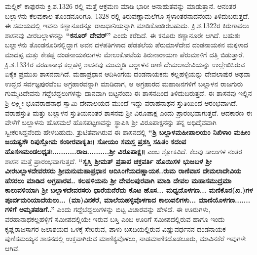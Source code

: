 ಮಲ್ಲಿಕ್​ ಕಾಫುರನು ಕ್ರಿ.ಶ.1326 ರಲ್ಲಿ ಮತ್ತೆ ಆಕ್ರಮಣ ಮಾಡಿ ಭಾರೀ ಅನಾಹುತವನ್ನು ಮಾಡುತ್ತಾನೆ. ಆನಂತರ ಬಲ್ಲಾಳನು ಕೆಲವುಕಾಲ ತೊಂಡನೂರಿಗೂ, 1328 ರಲ್ಲಿ ತಿರುವಣ್ಣಾಮಲೆಗೂ ಸ್ಥಳಾಂತರನಾದನೆಂದು ತಿಳಿದುಬರುತ್ತದೆ. ಈ ಸಮಯದಲ್ಲಿ ಇವನು ಕಣ್ಣಾನೂರನ್ನೂ ರಾಜಧಾನಿಯನ್ನಾಗಿ ಮಾಡಿಕೊಂಡಿರಬಹುದು. ಕ್ರಿ.ಶ.1322ರ ಕಿರುಗಾವಲು ಶಾಸನವು ವೀರಬಲ್ಲಾಳನನ್ನು \textbf{“ಕನೂರ್​ ದೇವರ್​”} ಎಂದು ಕರೆದಿದೆ. ಈ ಕನೂರು ಕಣ್ಣಾನೂರೇ ಆಗಿದೆ. ಬಹುಶಃ ಬಲ್ಲಾಳನು ತೊಂಡನೂರಿನಲ್ಲಿದ್ದಾಗ ಅವನ ದಳಪತಿಗಳಾದ ಹೆಡತಲೆಯ ಪೆರುಮಾಳೆದೇವ ದಂಡನಾಯಕನ ಮಕ್ಕಳಾದ ಮಾದಪ್ಪ ಮತ್ತು ಕೇತಪ್ಪ ದಂಡನಾಯಕರುಗಳು ಮೇಲುಕೋಟೆಯ ತಿರುನಾರಾಯಣ ಪೆರುಮಾಳಿಗೆ ದತ್ತಿ ಬಿಡುತ್ತಾರೆ. ಕ್ರಿ.ಶ.1334ರ ವರಹಾನಾಥ ಕಲ್ಲಹಳ್ಳಿ ಶಾಸನವು ಮುಮ್ಮಡಿ ಬಲ್ಲಾಳನ ರಾಣಿ ದೇಮಲಾದೇವಿಯನ್ನು ಉಲ್ಲೇಖಿಸಿರುವ ಏಕೈಕ ಪ್ರಮುಖ ಶಾಸನವಾಗಿದೆ. ಮಹಾಪ್ರಧಾನ ಆದಿಸಿಂಗೆಯ ದಂಡನಾಯಕನು ಕಲ್ಲಹಳ್ಳಿಯನ್ನು ದೇವಲಾಪುರ ಅಥವಾ ಉದ್ಭವ ಸರ್ವಜ್ಞಪುರವೆಂಬ ಅಗ್ರಹಾರವನ್ನಾಗಿ ಮಾಡಿದಾಗ, ಆ ಅಗ್ರಹಾರದ ಮಹಾಜನಗಳಿಗೆ ಬಲ್ಲಾಳನ ರಾಜಗುರು ಗುಮ್ಮಟದೇವನು ಗದ್ದೆಬೆದ್ದಲುಗಳನ್ನು ದಾನವಾಗಿ ಬಿಟ್ಟನೆಂದು ಈ ಶಾಸನದಿಂದ ತಿಳಿದುಬರುತ್ತದೆ. ಈ ಶಾಸನವು ಇಲ್ಲಿನ ಶ್ರಿ ಲಕ್ಷ್ಮೀ ಭೂವರಾಹನಾಥ ಸ್ವಾಮಿ ದೇವಾಲಯದ ಮುಂದೆ ಇದ್ದು ವರಾಹನಾಥನ ಸ್ತುತಿಯಿಂದ ಆರಂಭವಾಗಿದೆ. ವರಾಹಸ್ತುತಿ ಮತ್ತು ಬಲ್ಲಾಳನ ಸ್ತುತಿಯನಂತರ ಶಾಸನವು ಶ‍್ರೀ ವಿರೂಪಾಕ್ಷ ಎಂದು ಪ್ರಾರಂಭವಾಗುತ್ತದೆ. ಆದಕಾರಣ ಈ ವೇಳೆಗೆ ಬಲ್ಲಾಳನು ಹೊಸಮಲೆ ಹೊಸಪಟ್ಟಣವನ್ನು ಸ್ಥಾಪಿಸಿ ಶ‍್ರೀ ವಿರೂಪಾಕ್ಷನನ್ನು ತನ್ನ ಅಧಿದೈವವಾಗಿ ಸ್ವೀಕರಿಸಿದ್ದನೆಂದು ಹೇಳಬಹುದು. ತ್ರುಟಿತವಾಗಿರುವ ಈ ಶಾಸನದಲ್ಲಿ \textbf{“ಶ್ರಿ ಬಲ್ಲಾಳಮಹೀಪಾಲಯಂ ನಿಖಿಳಾಂ ಮಹೀಂ ಜಯತ್ಯಸೌ ರಿಪುಸ್ತೋಮ ಕಂಠೀರವಾಕೃತಿಃ। ಸೋಯಂ ಸಮಸ್ತ ಪ್ರಶಸ್ತಿ ಸಹಿತಂ ಕದಂವ ಹೊಸಣಮಂಡಲಧೃತಃ...........ರಾಜ..........ಶ‍್ರೀ ವಿರೂಪಾಕ್ಷ॥} ಎಂಬ ಶ್ಲೋಕವಿದೆ. ಕೆಲವು ಸಾಲುಗಳ ನಂತರ ಶಾಸನ ಮತ್ತೆ ಪ್ರಾರಂಭವಾಗುತ್ತದೆ. \textbf{“ಸ್ವಸ್ತಿ ಶ‍್ರೀಮತ್​ ಪ್ರತಾಪ ಚಕ್ರವರ್ತಿ ಹೊಯಿಸಳ ಭುಜಬಳ ಶ‍್ರೀ ವೀರಬಲ್ಲಾಳದೇವರಸರು ಶ‍್ರೀಮನುಮಹಾಪ್ರಧಾನ ಆದಿಸಿಂಗೆಯದಣ್ಣಾಯಕ..ರುಮ ರಾಣಿವಾಸ ದೇಮಲಾದೇವಿಯ ಹೆಸರಲು ಮಾಡಿದ ಅಗ್ರಹಾರವ.. ಕಲಹಳಿಯನು ಶ‍್ರೀ ದೇವಲಪುರವಾಗಿ ಮಾಡಿ ದೇವಲ ಮಹಾಸಮುದ್ರಮಾ ಕಾಲುವಳಿಯಾಗಿ ಶ‍್ರೀ ಬಲ್ಲಾಳದೇವರಸರು ಧಾರೆಯನೆರೆದು ಕೊಟ ಹೊಸ... ಮಧ್ಯದೊಳಗಣ... ಮಣಿಕೊನ(ಖ.)ಗಳ ಪೂರ್ವಮರಿಯಾದೆಯಲು... (ಮಾ)ವಿನಕೆರೆ, ಮಾಲೆಯಹಳ್ಳಿವೊಳಗಾದ ಕಾಲುವಲಿಗಳು... ಮಾಣಿಯೊಳಗಣ....... ಗಳಿಗೆ ಅಮೃತಪಡಿಗೆ..”} ಎಂದು ಗದ್ದೆಬೆದ್ದಲುಗಳನ್ನು ಬಿಟ್ಟ ವಿಚಾರವನ್ನು ಹೇಳಿದೆ. ಈ ಊರುಗಳು, ವರಹಾನಾಥಕಲ್ಲಹಳ್ಳಿಗೆ ಸಮೀಪದಲ್ಲಿಯೇ ಇರುವ ಬಸ್ತಿ ಎಂಬ ಊರಿಗೆ ಸಮೀಪದಲ್ಲಿರುವ ಹಾಗೂ ಇಂದು ಕೃಷ್ಣರಾಜಸಾಗರ ಜಲಾಶಯದ ಒಳಕ್ಕೆ ಸೇರಿರುವ, ಪಾಳು ಬಸದಿಯಲ್ಲಿರುವ ವಿಷ್ಣುವರ್ಧನನ ದಂಡನಾಯಕ ಪುಣಿಸಮಯ್ಯನ ಶಾಸನದಲ್ಲಿ ಉಕ್ತವಾಗಿರುವ ಮಾಣಿಕ್ಯವೊಳಲು, ನಾಡಮಾಣಿಕದೊಡಲೂರು, ಮಾವಿನಕೆರೆ ಇವುಗಳೇ ಆಗಿವೆ.

